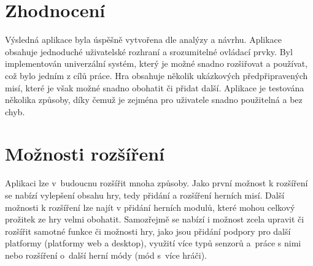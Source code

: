 \section{Zhodnocení}

Výsledná aplikace \myAppName{} byla úspěšně vytvořena dle analýzy a návrhu.
Aplikace obsahuje jednoduché uživatelské rozhraní a srozumitelné ovládací prvky.
Byl implementován univerzální systém,
který je možné snadno rozšiřovat a používat,
což bylo jedním z cílů práce.
Hra obsahuje několik ukázkových předpřipravených misí,
které je však možné snadno obohatit či přidat další.
Aplikace je testována několika způsoby,
díky čemuž je zejména pro uživatele snadno použitelná a bez chyb.

\section{Možnosti rozšíření}

Aplikaci lze v~budoucnu rozšířit mnoha způsoby.
Jako první možnost k rozšíření se nabízí vylepšení obsahu hry,
tedy přidání a rozšíření herních misí.
Další možnosti k rozšíření lze najít v přidání herních modulů,
které mohou celkový prožitek ze hry velmi obohatit.
Samozřejmě se nabízí i možnost zcela upravit či rozšířit samotné funkce či
možnosti hry,
jako jsou přidání podpory pro další platformy (platformy web a desktop),
využití více typů senzorů a~práce s nimi
nebo rozšíření o~další herní módy (mód s~více hráči). 
